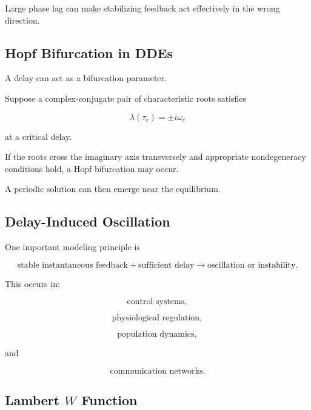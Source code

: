 Large phase lag can make stabilizing feedback act effectively in the wrong
direction.

\subsection{Hopf Bifurcation in DDEs}
\label{subsec:dde-hopf-bifurcation}

A delay can act as a bifurcation parameter.

Suppose a complex-conjugate pair of characteristic roots satisfies

\[
\boxed{
\lambda(\tau_c)
=
\pm i\omega_c
}
\]

at a critical delay.

If the roots cross the imaginary axis transversely and appropriate
nondegeneracy conditions hold, a Hopf bifurcation may occur.

A periodic solution can then emerge near the equilibrium.

\subsection{Delay-Induced Oscillation}
\label{subsec:delay-induced-oscillation}

One important modeling principle is

\[
\boxed{
\text{stable instantaneous feedback}
+
\text{sufficient delay}
\rightarrow
\text{oscillation or instability}.
}
\]

This occurs in:

\[
\boxed{
\text{control systems},
}
\]

\[
\boxed{
\text{physiological regulation},
}
\]

\[
\boxed{
\text{population dynamics},
}
\]

and

\[
\boxed{
\text{communication networks}.
}
\]

\subsection{Lambert \(W\) Function}
\label{subsec:dde-lambert-w}

